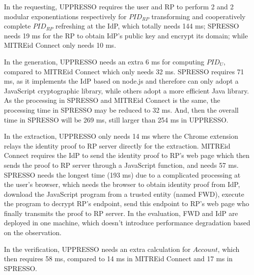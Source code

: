In the requesting, UPPRESSO requires the user and RP to perform 2 and 2  modular exponentiations respectively for $PID_{RP}$ transforming and cooperatively complete $PID_{RP}$ refreshing at the IdP, which totally needs 144 ms;  SPRESSO needs 19 ms for the RP to obtain IdP's public key and encrypt its domain; while MITREid Connect only needs 10 ms.

In the generation, UPPRESSO needs  an extra 6 ms for computing $PID_U$, compared to MITREid Connect which only needs 32 ms.
SPRESSO requires 71 ms, as it implements the IdP based on node.js and therefore can only adopt a JavaScript cryptographic library, while others adopt a more efficient Java library.
As the processing in SPRESSO and MITREid Connect is the same, the processing time in SPRESSO may be reduced to 32 ms. And, then the overall time in SPRESSO will be 269 ms, still larger than 254 ms in UPPRESSO.

In the extraction, UPPRESSO only needs 14 ms where the Chrome extension relays the identity proof to RP server directly for the extraction.
MITREid Connect requires the IdP to send the identity proof to  RP's web page which then sends the proof to RP server through a JavaScript function, and needs 57 ms.
SPRESSO needs the longest time (193 ms) due to a complicated processing at the user's browser,
  which needs the browser to obtain identity proof from IdP, download the JavaScript program from a trusted entity (named FWD), execute the program to decrypt RP's endpoint, send this endpoint to RP's web page who finally transmits the proof to RP server.
In the evaluation,  FWD and IdP are deployed in one machine, which doesn't introduce performance degradation based on the observation. %



In the verification, UPPRESSO needs an extra calculation for $Account$, which then requires  58 ms, compared to 14 ms in MITREid Connect and 17 ms in SPRESSO.



